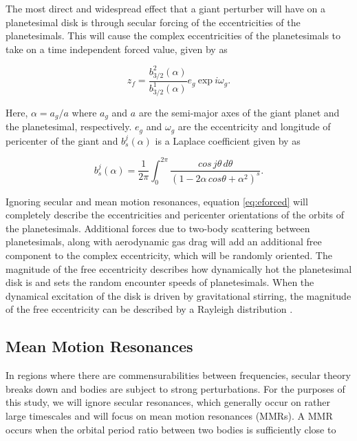 \documentclass[twocolumn]{aastex63}
\begin{document}
The most direct and widespread effect that a giant perturber will have on a planetesimal disk is through secular forcing of the eccentricities of the planetesimals. This will cause the complex eccentricities of the planetesimals to take on a time independent forced value, given by \citep{1999ApJ...527..918W} as

\begin{equation}\label{eq:eforced}
	z_{f} = \frac{b^{2}_{3/2} (\alpha)}{b^{1}_{3/2} (\alpha)} e_{g} ~ \mathrm{exp} ~ i \omega_{g}.
\end{equation}

\noindent Here, $\alpha = a_{g} / a$ where $a_{g}$ and $a$ are the semi-major axes of the giant planet and the planetesimal, respectively. $e_{g}$ and $\omega_{g}$ are the eccentricity and longitude of pericenter of the giant and $b^{j}_{s} (\alpha)$ is a Laplace coefficient given by \citep{2000ssd..book.....M} as

\begin{equation}\label{eq:lap}
	b_{s}^{j}(\alpha) = \frac{1}{2 \pi} \int_{0}^{2 \pi} \frac{cos \, j \theta \, d \theta}{\left( 1 - 2 \alpha \, cos \theta + \alpha^2 \right)^{s}}.
\end{equation}

Ignoring secular and mean motion resonances, equation \ref{eq:eforced} will completely describe the eccentricities and pericenter orientations of the orbits of the planetesimals. Additional forces due to two-body scattering between planetesimals, along with aerodynamic gas drag will add an additional free component to the complex eccentricity, which will be randomly oriented. The magnitude of the free eccentricity describes how dynamically hot the planetesimal disk is and sets the random encounter speeds of planetesimals. When the dynamical excitation of the disk is driven by gravitational stirring, the magnitude of the free eccentricity can be described by a Rayleigh distribution \citep{1992Icar...96..107I}.

\subsection{Mean Motion Resonances}

In regions where there are commensurabilities between frequencies, secular theory breaks down and bodies are subject to strong perturbations. For the purposes of this study, we will ignore secular resonances, which generally occur on rather large timescales and will focus on mean motion resonances (MMRs). A MMR occurs  when the orbital period ratio between two bodies is sufficiently close to
\end{document}
